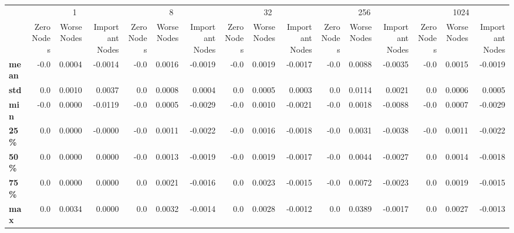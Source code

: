 \begin{tabular}{lrrrrrrrrrrrrrrr}
\toprule
{} & \multicolumn{3}{c}{1} & \multicolumn{3}{c}{8} & \multicolumn{3}{c}{32} & \multicolumn{3}{c}{256} & \multicolumn{3}{c}{1024} \\
{} & Zero Nodes & Worse Nodes & Important Nodes & Zero Nodes & Worse Nodes & Important Nodes & Zero Nodes & Worse Nodes & Important Nodes & Zero Nodes & Worse Nodes & Important Nodes & Zero Nodes & Worse Nodes & Important Nodes \\
\midrule
\textbf{mean} &       -0.0 &      0.0004 &         -0.0014 &       -0.0 &      0.0016 &         -0.0019 &       -0.0 &      0.0019 &         -0.0017 &       -0.0 &      0.0088 &         -0.0035 &       -0.0 &      0.0015 &         -0.0019 \\
\textbf{std } &        0.0 &      0.0010 &          0.0037 &        0.0 &      0.0008 &          0.0004 &        0.0 &      0.0005 &          0.0003 &        0.0 &      0.0114 &          0.0021 &        0.0 &      0.0006 &          0.0005 \\
\textbf{min } &       -0.0 &      0.0000 &         -0.0119 &       -0.0 &      0.0005 &         -0.0029 &       -0.0 &      0.0010 &         -0.0021 &       -0.0 &      0.0018 &         -0.0088 &       -0.0 &      0.0007 &         -0.0029 \\
\textbf{25\% } &        0.0 &      0.0000 &         -0.0000 &       -0.0 &      0.0011 &         -0.0022 &       -0.0 &      0.0016 &         -0.0018 &       -0.0 &      0.0031 &         -0.0038 &       -0.0 &      0.0011 &         -0.0022 \\
\textbf{50\% } &        0.0 &      0.0000 &          0.0000 &       -0.0 &      0.0013 &         -0.0019 &       -0.0 &      0.0019 &         -0.0017 &       -0.0 &      0.0044 &         -0.0027 &        0.0 &      0.0014 &         -0.0018 \\
\textbf{75\% } &        0.0 &      0.0000 &          0.0000 &        0.0 &      0.0021 &         -0.0016 &        0.0 &      0.0023 &         -0.0015 &       -0.0 &      0.0072 &         -0.0023 &        0.0 &      0.0019 &         -0.0015 \\
\textbf{max } &        0.0 &      0.0034 &          0.0000 &        0.0 &      0.0032 &         -0.0014 &        0.0 &      0.0028 &         -0.0012 &        0.0 &      0.0389 &         -0.0017 &        0.0 &      0.0027 &         -0.0013 \\
\bottomrule
\end{tabular}
